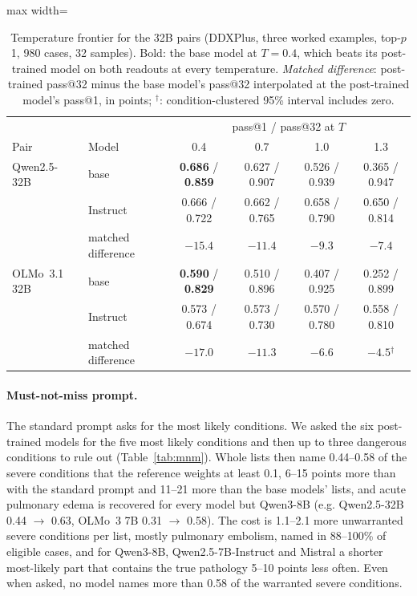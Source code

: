 \documentclass[11pt]{article}
\begin{document}
\begin{table}[t]
\centering\small
\begin{adjustbox}{max width=\linewidth}
\begin{tabular}{llcccc}
\toprule
 & & \multicolumn{4}{c}{pass@1 / pass@32 at $T$} \\
Pair & Model & 0.4 & 0.7 & 1.0 & 1.3 \\
\midrule
Qwen2.5-32B & base & \textbf{0.686} / \textbf{0.859} & 0.627 / 0.907 & 0.526 / 0.939 & 0.365 / 0.947 \\
 & Instruct & 0.666 / 0.722 & 0.662 / 0.765 & 0.658 / 0.790 & 0.650 / 0.814 \\
 & matched difference & $-15.4$ & $-11.4$ & $-9.3$ & $-7.4$ \\
\midrule
OLMo~3.1 32B & base & \textbf{0.590} / \textbf{0.829} & 0.510 / 0.896 & 0.407 / 0.925 & 0.252 / 0.899 \\
 & Instruct & 0.573 / 0.674 & 0.573 / 0.730 & 0.570 / 0.780 & 0.558 / 0.810 \\
 & matched difference & $-17.0$ & $-11.3$ & $-6.6$ & $-4.5$$^{\dagger}$ \\
\bottomrule
\end{tabular}
\end{adjustbox}
\caption{Temperature frontier for the 32B pairs (DDXPlus, three worked examples, top-$p$ 1, 980 cases, 32 samples). Bold: the base model at $T{=}0.4$, which beats its post-trained model on both readouts at every temperature. \emph{Matched difference}: post-trained pass@32 minus the base model's pass@32 interpolated at the post-trained model's pass@1, in points; $^{\dagger}$: condition-clustered 95\% interval includes zero.}
\label{tab:frontier32}
\end{table}

\paragraph{Must-not-miss prompt.} The standard prompt asks for the most likely conditions. We asked the six post-trained models for the five most likely conditions and then up to three dangerous conditions to rule out (Table~\ref{tab:mnm}). Whole lists then name 0.44--0.58 of the severe conditions that the reference weights at least 0.1, 6--15 points more than with the standard prompt and 11--21 more than the base models' lists, and acute pulmonary edema is recovered for every model but Qwen3-8B (e.g. Qwen2.5-32B 0.44 $\rightarrow$ 0.63, OLMo~3 7B 0.31 $\rightarrow$ 0.58). The cost is 1.1--2.1 more unwarranted severe conditions per list, mostly pulmonary embolism, named in 88--100\% of eligible cases, and for Qwen3-8B, Qwen2.5-7B-Instruct and Mistral a shorter most-likely part that contains the true pathology 5--10 points less often. Even when asked, no model names more than 0.58 of the warranted severe conditions.
\end{document}
